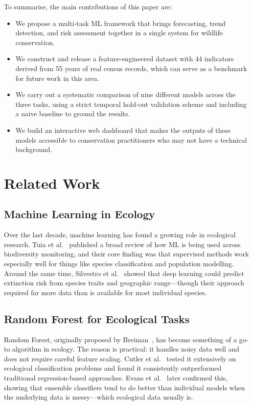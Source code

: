 \documentclass[conference]{IEEEtran}
\begin{document}
To summarise, the main contributions of this paper are:

\begin{itemize}
\item We propose a multi-task ML framework that brings forecasting, trend detection, and risk assessment together in a single system for wildlife conservation.
\item We construct and release a feature-engineered dataset with 44 indicators derived from 55 years of real census records, which can serve as a benchmark for future work in this area.
\item We carry out a systematic comparison of nine different models across the three tasks, using a strict temporal hold-out validation scheme and including a naive baseline to ground the results.
\item We build an interactive web dashboard that makes the outputs of these models accessible to conservation practitioners who may not have a technical background.
\end{itemize}

\section{Related Work}

\subsection{Machine Learning in Ecology}
Over the last decade, machine learning has found a growing role in ecological research. Tuia et al.~\cite{tuia2022} published a broad review of how ML is being used across biodiversity monitoring, and their core finding was that supervised methods work especially well for things like species classification and population modelling. Around the same time, Silvestro et al.~\cite{silvestro2022} showed that deep learning could predict extinction risk from species traits and geographic range---though their approach required far more data than is available for most individual species.

\subsection{Random Forest for Ecological Tasks}
Random Forest, originally proposed by Breiman~\cite{breiman2001}, has become something of a go-to algorithm in ecology. The reason is practical: it handles noisy data well and does not require careful feature scaling. Cutler et al.~\cite{cutler2007} tested it extensively on ecological classification problems and found it consistently outperformed traditional regression-based approaches. Evans et al.~\cite{evans2011} later confirmed this, showing that ensemble classifiers tend to do better than individual models when the underlying data is messy---which ecological data usually is.
\end{document}
